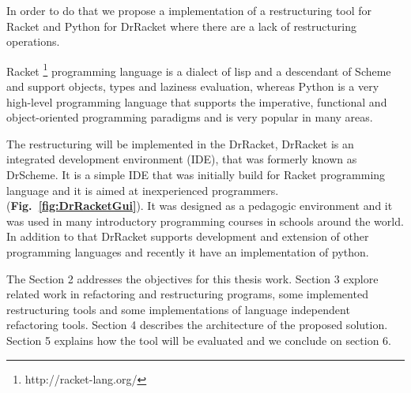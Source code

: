 In order to do that we propose a implementation of a restructuring tool for Racket and Python for DrRacket where there are a lack of restructuring operations.


Racket \footnote{http://racket-lang.org/} programming language is a dialect of lisp and a descendant of Scheme and support objects, types and laziness evaluation,
whereas Python is a very high-level programming language that supports the imperative, functional and object-oriented programming paradigms and is very popular in many areas.


The restructuring will be implemented in the DrRacket, DrRacket is an integrated development environment (IDE), that was formerly known as DrScheme. It is a simple IDE that was initially build for Racket programming language and it is aimed at inexperienced programmers. ({\bf Fig.~\ref{fig:DrRacketGui}}).
It was designed as a pedagogic environment \cite{drscheme_pegadogy} and it was used in many introductory programming courses in schools around the world. In addition to that DrRacket supports development and extension of other programming languages \cite{tobin2011languages} and recently it have an implementation of python. \cite{ramos2014implementation}


The Section 2 addresses the objectives for this thesis work. Section 3 explore related work in refactoring and restructuring programs, some implemented restructuring tools and some implementations of language independent refactoring tools. Section 4 describes the architecture of the proposed solution. Section 5 explains how the tool will be evaluated and we conclude on section 6.




